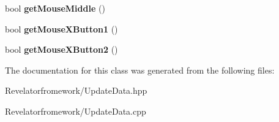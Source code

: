 \begin{DoxyCompactItemize}
\item 
\hypertarget{class_update_data_ad35a1239212d0e498286ab0a4e9f14b0}{bool {\bfseries get\-Mouse\-Middle} ()}\label{class_update_data_ad35a1239212d0e498286ab0a4e9f14b0}

\item 
\hypertarget{class_update_data_a62a79016b1e473832d03ae46b89252ae}{bool {\bfseries get\-Mouse\-X\-Button1} ()}\label{class_update_data_a62a79016b1e473832d03ae46b89252ae}

\item 
\hypertarget{class_update_data_a3a72e28655b87878de8dafbf07b7d344}{bool {\bfseries get\-Mouse\-X\-Button2} ()}\label{class_update_data_a3a72e28655b87878de8dafbf07b7d344}

\end{DoxyCompactItemize}


The documentation for this class was generated from the following files\-:\begin{DoxyCompactItemize}
\item 
Revelatorfromework/Update\-Data.\-hpp\item 
Revelatorfromework/Update\-Data.\-cpp\end{DoxyCompactItemize}
